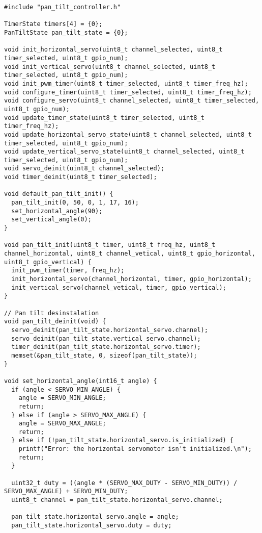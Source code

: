 \begin{lstlisting}
#include "pan_tilt_controller.h"

TimerState timers[4] = {0};
PanTiltState pan_tilt_state = {0};

void init_horizontal_servo(uint8_t channel_selected, uint8_t timer_selected, uint8_t gpio_num);
void init_vertical_servo(uint8_t channel_selected, uint8_t timer_selected, uint8_t gpio_num);
void init_pwm_timer(uint8_t timer_selected, uint8_t timer_freq_hz);
void configure_timer(uint8_t timer_selected, uint8_t timer_freq_hz);
void configure_servo(uint8_t channel_selected, uint8_t timer_selected, uint8_t gpio_num);
void update_timer_state(uint8_t timer_selected, uint8_t timer_freq_hz);
void update_horizontal_servo_state(uint8_t channel_selected, uint8_t timer_selected, uint8_t gpio_num);
void update_vertical_servo_state(uint8_t channel_selected, uint8_t timer_selected, uint8_t gpio_num);
void servo_deinit(uint8_t channel_selected);
void timer_deinit(uint8_t timer_selected);

void default_pan_tilt_init() {
  pan_tilt_init(0, 50, 0, 1, 17, 16);
  set_horizontal_angle(90);
  set_vertical_angle(0);
}

void pan_tilt_init(uint8_t timer, uint8_t freq_hz, uint8_t channel_horizontal, uint8_t channel_vetical, uint8_t gpio_horizontal, uint8_t gpio_vertical) {
  init_pwm_timer(timer, freq_hz);
  init_horizontal_servo(channel_horizontal, timer, gpio_horizontal);
  init_vertical_servo(channel_vetical, timer, gpio_vertical);
}

// Pan tilt desinstalation
void pan_tilt_deinit(void) {
  servo_deinit(pan_tilt_state.horizontal_servo.channel);
  servo_deinit(pan_tilt_state.vertical_servo.channel);
  timer_deinit(pan_tilt_state.horizontal_servo.timer);
  memset(&pan_tilt_state, 0, sizeof(pan_tilt_state));
}

void set_horizontal_angle(int16_t angle) {
  if (angle < SERVO_MIN_ANGLE) {
    angle = SERVO_MIN_ANGLE;
    return;
  } else if (angle > SERVO_MAX_ANGLE) {
    angle = SERVO_MAX_ANGLE;
    return;
  } else if (!pan_tilt_state.horizontal_servo.is_initialized) {
    printf("Error: the horizontal servomotor isn't initialized.\n");
    return;
  }

  uint32_t duty = ((angle * (SERVO_MAX_DUTY - SERVO_MIN_DUTY)) / SERVO_MAX_ANGLE) + SERVO_MIN_DUTY;
  uint8_t channel = pan_tilt_state.horizontal_servo.channel;

  pan_tilt_state.horizontal_servo.angle = angle;
  pan_tilt_state.horizontal_servo.duty = duty;


\end{lstlisting}
